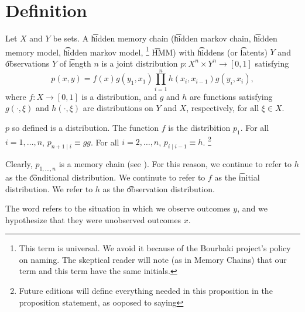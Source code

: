 
\section*{Definition}

Let $X$ and $Y$ be sets.
A \t{hidden memory chain} (\t{hidden markov chain}, \t{hidden memory model}, \t{hidden markov model},
  \ifhmode\unskip\fi\footnote{
This term is universal.
We avoid it because of the Bourbaki project's policy on naming.
The skeptical reader will note (as in  {Memory Chains}) that our term and this term have the same initials.
  }
\t{HMM}) with \t{hiddens} (or \t{latents}) $Y$ and \t{observations} $Y$ of \t{length} $n$ is a joint distribution $p: X^n \times Y^n \to [0, 1]$ satisfying
  \[
p(x, y) = f(x)g(y_1, x_1)\prod_{i = 1}^{n} h(x_i, x_{i-1}) g(y_i, x_i),
  \]
where $f: X \to [0, 1]$ is a distribution, and $g$ and $h$ are functions satisfying $g(\cdot , \xi )$ and $h(\cdot , \xi )$ are distributions on $Y$ and $X$, respectively, for all $\xi \in X$.
\begin{proposition}$p$ so defined is a distribution.
The function $f$ is the distribition $p_{1}$.
For all $i = 1, \dots , n$, $p_{n+1 \mid i} \equiv gg$.
For all $i = 2, \dots , n$, $p_{i \mid i-1} \equiv h$.
    \ifhmode\unskip\fi\footnote{
Future editions will define everything needed in this proposition in the proposition statement, as ooposed to saying 
    }\end{proposition}

Clearly, $p_{1, \dots , n}$ is a memory chain (see ).
For this reason, we continue to refer to $h$ as the \t{conditional distribution}.
We continute to refer to $f$ as the \t{initial distribution}.
We refer to $h$ as the \t{observation distribution}.

The word  refers to the situation in which we observe outcomes $y$, and we hypothesize that they were  unobserved outcomes $x$.

\blankpage
